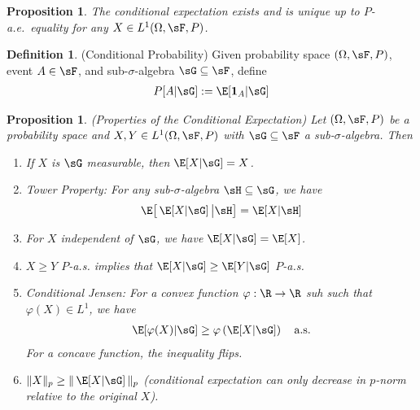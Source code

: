 \documentclass[12pt]{article}
\theoremstyle{plain}
\newtheorem{prop}[thm]{Proposition}
\theoremstyle{definition}
\newtheorem{defn}[thm]{Definition}
\theoremstyle{remark}
\newcommand{\ra}{\rightarrow}
\newcommand{\one}[1]{\mathbf{1}_{#1}}
\begin{document}
\begin{prop}
The conditional expectation \emph{exists} and is \emph{unique} up to
$P$-a.e.\ equality for any $X\in L^1(\Omega,\sF,P)$.
\end{prop}

\begin{defn}(Conditional Probability)
Given probability space $(\Omega,\sF,P)$, event $A\in\sF$, and
sub-$\sigma$-algebra $\sG\subseteq\sF$, define
\begin{align*}
  P[A|\sG] := \E[\one{A}|\sG]
\end{align*}
\end{defn}

\begin{prop}\emph{(Properties of the Conditional Expectation)}
Let $(\Omega,\sF,P)$ be a probability space and
$X,Y\in L^1(\Omega,\sF,P)$ with $\sG\subseteq\sF$ a
sub-$\sigma$-algebra. Then
\begin{enumerate}[label=(\roman*)]
  \item If $X$ is $\sG$ measurable, then $\E[X|\sG]=X$.
  \item Tower Property: For any sub-$\sigma$-algebra $\sH\subseteq\sG$,
    we have
    \begin{align*}
      \E\big[
        \,\E[X|\sG]\,
        \big|
        \sH
      \big]
      = \E[X|\sH]
    \end{align*}

  \item For $X$ independent of $\sG$, we have $\E[X|\sG]=\E[X]$.

  \item $X \geq Y$ $P$-a.s. implies that $\E[X|\sG]\geq\E[Y|\sG]$
    $P$-a.s.
  \item Conditional Jensen: For a convex function $\varphi:\R\ra \R$ suh
    such that $\varphi(X)\in L^1$, we have
    \begin{align*}
      \E[ \varphi(X) |\sG]
      \geq \varphi\left(\E[X|\sG]\right)
      \quad \text{a.s.}
    \end{align*}
    For a concave function, the inequality flips.

  \item $\lVert X\rVert_p\geq \lVert\,\E[X|\sG]\,\rVert_p$ (conditional
    expectation can only decrease in $p$-norm relative to the original
    $X$).
\end{enumerate}
\end{prop}
\end{document}
